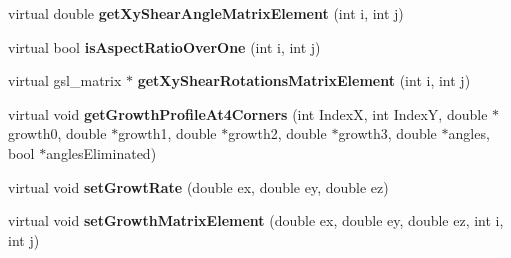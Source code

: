 \begin{DoxyCompactItemize}
\item 
\hypertarget{classGrowthFunctionBase_adfa5e38c1b2d748c035a3bdbe8717d73}{}virtual double {\bfseries get\+Xy\+Shear\+Angle\+Matrix\+Element} (int i, int j)\label{classGrowthFunctionBase_adfa5e38c1b2d748c035a3bdbe8717d73}

\item 
\hypertarget{classGrowthFunctionBase_a01bd724756ffac9b8c1d1693b2547588}{}virtual bool {\bfseries is\+Aspect\+Ratio\+Over\+One} (int i, int j)\label{classGrowthFunctionBase_a01bd724756ffac9b8c1d1693b2547588}

\item 
\hypertarget{classGrowthFunctionBase_a70f43b1e57d2be8ca0e2a937da333dfa}{}virtual gsl\+\_\+matrix $\ast$ {\bfseries get\+Xy\+Shear\+Rotations\+Matrix\+Element} (int i, int j)\label{classGrowthFunctionBase_a70f43b1e57d2be8ca0e2a937da333dfa}

\item 
\hypertarget{classGrowthFunctionBase_ae529d0ae06ca241d94bfa8fd831af99b}{}virtual void {\bfseries get\+Growth\+Profile\+At4\+Corners} (int Index\+X, int Index\+Y, double $\ast$growth0, double $\ast$growth1, double $\ast$growth2, double $\ast$growth3, double $\ast$angles, bool $\ast$angles\+Eliminated)\label{classGrowthFunctionBase_ae529d0ae06ca241d94bfa8fd831af99b}

\item 
\hypertarget{classGrowthFunctionBase_abcfbd2e1fbad91b3f9002ef7fc7625e5}{}virtual void {\bfseries set\+Growt\+Rate} (double ex, double ey, double ez)\label{classGrowthFunctionBase_abcfbd2e1fbad91b3f9002ef7fc7625e5}

\item 
\hypertarget{classGrowthFunctionBase_a29781080624a8ab028af36f3326b6240}{}virtual void {\bfseries set\+Growth\+Matrix\+Element} (double ex, double ey, double ez, int i, int j)\label{classGrowthFunctionBase_a29781080624a8ab028af36f3326b6240}

\end{DoxyCompactItemize}
